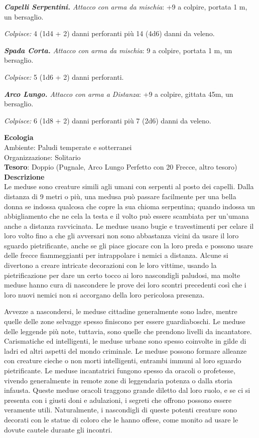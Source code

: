 \begin{multicols}{2}
	\textit{\textbf{Capelli Serpentini.} Attacco con arma da mischia}: +9 a colpire, portata 1 m, un bersaglio.

	\textit{Colpisce:} 4 (1d4 + 2) danni perforanti più 14 (4d6) danni da veleno.

	\textit{\textbf{Spada Corta.} Attacco con arma da mischia}: 9 a colpire, portata 1 m, un bersaglio.

	\textit{Colpisce:} 5 (1d6 + 2) danni perforanti.

	\textit{\textbf{Arco Lungo.} Attacco con arma a Distanza}: +9 a colpire, gittata 45m, un bersaglio.

	\textit{Colpisce:} 6 (1d8 + 2) danni perforanti più 7 (2d6) danni da veleno.

	\textbf{Ecologia}\\
	Ambiente: Paludi temperate e sotterranei\\
	Organizzazione: Solitario\\
	\textbf{Tesoro}: Doppio (Pugnale, Arco Lungo Perfetto con 20 Frecce, altro tesoro)\\
	\textbf{Descrizione}\\
	Le meduse sono creature simili agli umani con serpenti al posto dei capelli. Dalla distanza di 9 metri o più, una medusa può passare facilmente per una bella donna se indossa qualcosa che copre la sua chioma serpentina; quando indossa un abbigliamento che ne cela la testa e il volto può essere scambiata per un'umana anche a distanza ravvicinata. Le meduse usano bugie e travestimenti per celare il loro volto fino a che gli avversari non sono abbastanza vicini da usare il loro sguardo pietrificante, anche se gli piace giocare con la loro preda e possono usare delle frecce fiammeggianti per intrappolare i nemici a distanza. Alcune si divertono a creare intricate decorazioni con le loro vittime, usando la pietrificazione per dare un certo tocco ai loro nascondigli paludosi, ma molte meduse hanno cura di nascondere le prove dei loro scontri precedenti così che i loro nuovi nemici non si accorgano della loro pericolosa presenza.

	Avvezze a nascondersi, le meduse cittadine generalmente sono ladre, mentre quelle delle zone selvagge spesso finiscono per essere guardiaboschi. Le meduse delle leggende più note, tuttavia, sono quelle che prendono livelli da incantatore. Carismatiche ed intelligenti, le meduse urbane sono spesso coinvolte in gilde di ladri ed altri aspetti del mondo criminale. Le meduse possono formare alleanze con creature cieche o non morti intelligenti, entrambi immuni al loro sguardo pietrificante. Le meduse incantatrici fungono spesso da oracoli o profetesse, vivendo generalmente in remote zone di leggendaria potenza o dalla storia infausta. Queste meduse oracoli traggono grande diletto dal loro ruolo, e se ci si presenta con i giusti doni e adulazioni, i segreti che offrono possono essere veramente utili. Naturalmente, i nascondigli di queste potenti creature sono decorati con le statue di coloro che le hanno offese, come monito ad usare le dovute cautele durante gli incontri.


\end{multicols}
